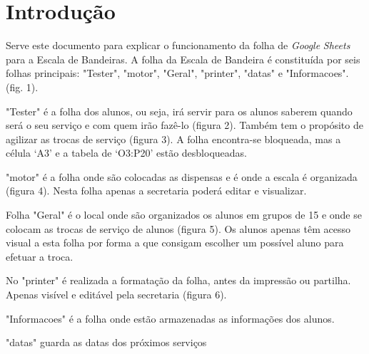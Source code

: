 \graphicspath{{Images/}}

\section{Introdução}
 
Serve este documento para explicar o funcionamento da folha de \textit{Google} \textit{Sheets} para a Escala de Bandeiras.
A folha da Escala de Bandeira é constituída por seis folhas principais: "Tester", "motor", "Geral", "printer", "datas" e "Informacoes".  (fig. 1).

"Tester" é a folha dos alunos, ou seja, irá servir para os alunos saberem quando será o seu serviço e com quem irão fazê-lo (figura 2). Também tem o propósito de agilizar as trocas de serviço (figura 3). A folha encontra-se bloqueada, mas a célula ‘A3’ e a tabela de ‘O3:P20’ estão desbloqueadas.

"motor" é a folha onde são colocadas as dispensas e é onde a escala é organizada (figura 4). Nesta folha apenas a secretaria poderá editar e visualizar.

Folha "Geral" é o local onde são organizados os alunos em grupos de 15 e onde se colocam as trocas de serviço de alunos (figura 5). Os alunos apenas têm acesso visual a esta folha por forma a que consigam escolher um possível aluno para efetuar a troca.

No "printer" é realizada a formatação da folha, antes da impressão ou partilha. Apenas visível e editável pela secretaria (figura 6).

"Informacoes" é a folha onde estão armazenadas as informações dos alunos.

"datas" guarda as datas dos próximos serviços